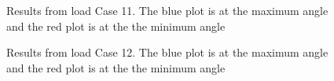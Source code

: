 \begin{figure}[H]
\hfill
{}\hfill
\caption[$\; \:$Results from load Case 11]{Results from load Case 11. The blue plot is at the maximum angle and the red plot is at the the minimum angle}
\label{fig:r11}
\end{figure}

\begin{figure}[H]
\hfill
{}\hfill
\caption[$\; \:$Results from load Case 12]{Results from load Case 12. The blue plot is at the maximum angle and the red plot is at the the minimum angle}
\label{fig:r12}
\end{figure}


